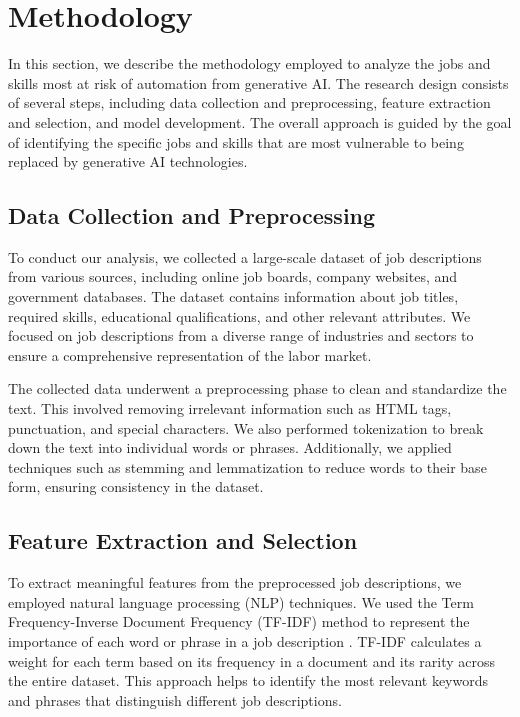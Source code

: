 \documentclass{article}
\begin{document}
\section{Methodology}

In this section, we describe the methodology employed to analyze the jobs and skills most at risk of automation from generative AI. The research design consists of several steps, including data collection and preprocessing, feature extraction and selection, and model development. The overall approach is guided by the goal of identifying the specific jobs and skills that are most vulnerable to being replaced by generative AI technologies.

\subsection{Data Collection and Preprocessing}

To conduct our analysis, we collected a large-scale dataset of job descriptions from various sources, including online job boards, company websites, and government databases. The dataset contains information about job titles, required skills, educational qualifications, and other relevant attributes. We focused on job descriptions from a diverse range of industries and sectors to ensure a comprehensive representation of the labor market.

The collected data underwent a preprocessing phase to clean and standardize the text. This involved removing irrelevant information such as HTML tags, punctuation, and special characters. We also performed tokenization to break down the text into individual words or phrases. Additionally, we applied techniques such as stemming and lemmatization to reduce words to their base form, ensuring consistency in the dataset.

\subsection{Feature Extraction and Selection}

To extract meaningful features from the preprocessed job descriptions, we employed natural language processing (NLP) techniques. We used the Term Frequency-Inverse Document Frequency (TF-IDF) method to represent the importance of each word or phrase in a job description \cite{salton1988term}. TF-IDF calculates a weight for each term based on its frequency in a document and its rarity across the entire dataset. This approach helps to identify the most relevant keywords and phrases that distinguish different job descriptions.
\end{document}
